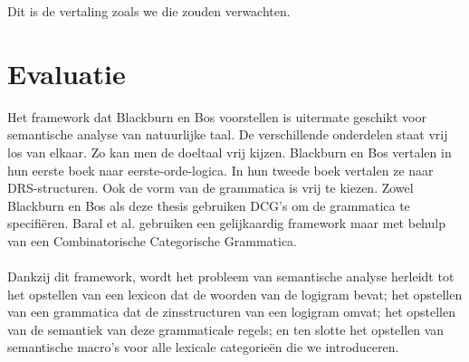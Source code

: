 Dit is de vertaling zoals we die zouden verwachten.

\section{Evaluatie}
Het framework dat Blackburn en Bos voorstellen is uitermate geschikt voor semantische analyse van natuurlijke taal. De verschillende onderdelen staat vrij los van elkaar. Zo kan men de doeltaal vrij kijzen. Blackburn en Bos vertalen in hun eerste boek \cite{Blackburn2005} naar eerste-orde-logica. In hun tweede boek \cite{Blackburn2006} vertalen ze naar DRS-structuren. Ook de vorm van de grammatica is vrij te kiezen. Zowel Blackburn en Bos als deze thesis gebruiken DCG's om de grammatica te specifiëren. Baral et al. \cite{Baral2008} gebruiken een gelijkaardig framework maar met behulp van een Combinatorische Categorische Grammatica.

\paragraph{} Dankzij dit framework, wordt het probleem van semantische analyse herleidt tot het opstellen van een lexicon dat de woorden van de logigram bevat; het opstellen van een grammatica dat de zinsstructuren van een logigram omvat; het opstellen van de semantiek van deze grammaticale regels; en ten slotte het opstellen van semantische macro's voor alle lexicale categorieën die we introduceren.
